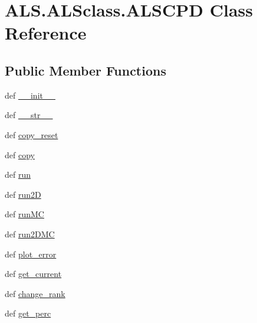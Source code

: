 \hypertarget{class_a_l_s_1_1_a_l_sclass_1_1_a_l_s_c_p_d}{\section{A\+L\+S.\+A\+L\+Sclass.\+A\+L\+S\+C\+P\+D Class Reference}
\label{class_a_l_s_1_1_a_l_sclass_1_1_a_l_s_c_p_d}
}
\subsection*{Public Member Functions}
\begin{DoxyCompactItemize}
\item 
def \hyperlink{class_a_l_s_1_1_a_l_sclass_1_1_a_l_s_c_p_d_ad31b79d2c385e660fe3810310a764b06}{\+\_\+\+\_\+init\+\_\+\+\_\+}
\item 
def \hyperlink{class_a_l_s_1_1_a_l_sclass_1_1_a_l_s_c_p_d_ac3d3da05b02cf3de4326b3286aa20474}{\+\_\+\+\_\+str\+\_\+\+\_\+}
\item 
def \hyperlink{class_a_l_s_1_1_a_l_sclass_1_1_a_l_s_c_p_d_a271b114c087543c0ccf1e4692025455b}{copy\+\_\+reset}
\item 
def \hyperlink{class_a_l_s_1_1_a_l_sclass_1_1_a_l_s_c_p_d_ae50549d7e5df19260ce0892acf8664ee}{copy}
\item 
def \hyperlink{class_a_l_s_1_1_a_l_sclass_1_1_a_l_s_c_p_d_abd4b945c9ab6d21530ca62d4960dec8f}{run}
\item 
def \hyperlink{class_a_l_s_1_1_a_l_sclass_1_1_a_l_s_c_p_d_ad3ac941a83ff0e755fd91bb131773e5f}{run2\+D}
\item 
def \hyperlink{class_a_l_s_1_1_a_l_sclass_1_1_a_l_s_c_p_d_af20a0e01f143f265f72fcb3d94fd2faf}{run\+M\+C}
\item 
def \hyperlink{class_a_l_s_1_1_a_l_sclass_1_1_a_l_s_c_p_d_ae3a5c74ea1f38eb721aebd2fc6aba8a9}{run2\+D\+M\+C}
\item 
def \hyperlink{class_a_l_s_1_1_a_l_sclass_1_1_a_l_s_c_p_d_a1d8fb455fb2c453f926b55b0446750e8}{plot\+\_\+error}
\item 
def \hyperlink{class_a_l_s_1_1_a_l_sclass_1_1_a_l_s_c_p_d_a437ffb8ecdb65dcf1c60312056945946}{get\+\_\+current}
\item 
def \hyperlink{class_a_l_s_1_1_a_l_sclass_1_1_a_l_s_c_p_d_a78883baa5acafd4ee5b700d2baba0852}{change\+\_\+rank}
\item 
def \hyperlink{class_a_l_s_1_1_a_l_sclass_1_1_a_l_s_c_p_d_adeeea488767fb7962d5eb842fec051a5}{get\+\_\+perc}
\end{DoxyCompactItemize}
